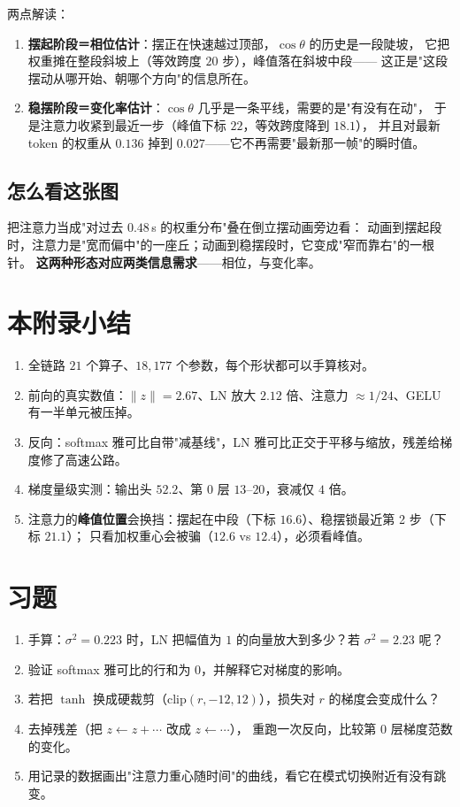 两点解读：

\begin{enumerate}[leftmargin=2em,itemsep=3pt]
  \item \textbf{摆起阶段＝相位估计}：摆正在快速越过顶部，$\cos\theta$ 的历史是一段陡坡，
        它把权重摊在整段斜坡上（等效跨度 $20$ 步），峰值落在斜坡中段——
        这正是"这段摆动从哪开始、朝哪个方向"的信息所在。
  \item \textbf{稳摆阶段＝变化率估计}：$\cos\theta$ 几乎是一条平线，需要的是"有没有在动"，
        于是注意力收紧到最近一步（峰值下标 $22$，等效跨度降到 $18.1$），
        并且对最新 token 的权重从 $0.136$ 掉到 $0.027$——它不再需要"最新那一帧"的瞬时值。
\end{enumerate}

\subsection{怎么看这张图}

把注意力当成"对过去 $0.48$\,s 的权重分布"叠在倒立摆动画旁边看：
动画到摆起段时，注意力是"宽而偏中"的一座丘；动画到稳摆段时，它变成"窄而靠右"的一根针。
\textbf{这两种形态对应两类信息需求}——相位，与变化率。

\section{本附录小结}
\begin{enumerate}[leftmargin=2em,itemsep=2pt]
  \item 全链路 $21$ 个算子、$18{,}177$ 个参数，每个形状都可以手算核对。
  \item 前向的真实数值：$\|z\|=2.67$、LN 放大 $2.12$ 倍、注意力 $\approx1/24$、GELU 有一半单元被压掉。
  \item 反向：softmax 雅可比自带"减基线"，LN 雅可比正交于平移与缩放，残差给梯度修了高速公路。
  \item 梯度量级实测：输出头 $52.2$、第 0 层 $13$--$20$，衰减仅 $4$ 倍。
  \item 注意力的\textbf{峰值位置}会换挡：摆起在中段（下标 $16.6$）、稳摆锁最近第 2 步（下标 $21.1$）；
        只看加权重心会被骗（$12.6$ vs $12.4$），必须看峰值。
\end{enumerate}

\section*{习题}
\begin{enumerate}[leftmargin=2em,itemsep=6pt]
  \item 手算：$\sigma^2=0.223$ 时，LN 把幅值为 $1$ 的向量放大到多少？若 $\sigma^2=2.23$ 呢？
  \item 验证 softmax 雅可比的行和为 $0$，并解释它对梯度的影响。
  \item 若把 $\tanh$ 换成硬裁剪（$\mathrm{clip}(r,-12,12)$），损失对 $r$ 的梯度会变成什么？
  \item 去掉残差（把 $z\leftarrow z+\cdots$ 改成 $z\leftarrow\cdots$），
        重跑一次反向，比较第 0 层梯度范数的变化。
  \item 用记录的数据画出"注意力重心随时间"的曲线，看它在模式切换附近有没有跳变。
\end{enumerate}

